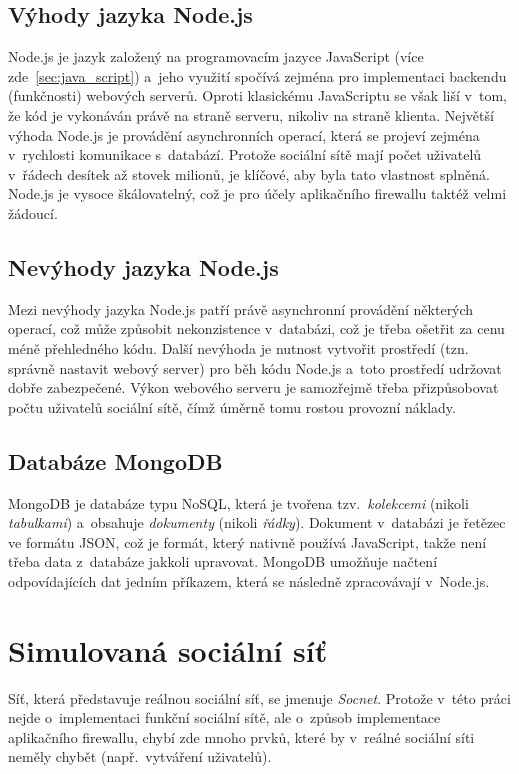 \subsection*{Výhody jazyka Node.js}
Node.js je jazyk založený na programovacím jazyce JavaScript (více zde~\ref{sec:java_script}) a~jeho využití spočívá zejména pro implementaci backendu (funkčnosti) webových serverů. Oproti klasickému JavaScriptu se však liší v~tom, že kód je vykonáván právě na straně serveru, nikoliv na straně klienta. Největší výhoda Node.js je provádění asynchronních operací, která se projeví zejména v~rychlosti komunikace s~databází. Protože sociální sítě mají počet uživatelů v~řádech desítek až stovek milionů, je klíčové, aby byla tato vlastnost splněná. Node.js je vysoce škálovatelný, což je pro účely aplikačního firewallu taktéž velmi žádoucí.

\subsection*{Nevýhody jazyka Node.js}
Mezi nevýhody jazyka Node.js patří právě asynchronní provádění některých operací, což může způsobit nekonzistence v~databázi, což je třeba ošetřit za cenu méně přehledného kódu. Další nevýhoda je nutnost vytvořit prostředí (tzn. správně nastavit webový server) pro běh kódu Node.js a~toto prostředí udržovat dobře zabezpečené. Výkon webového serveru je samozřejmě třeba přizpůsobovat počtu uživatelů sociální sítě, čímž úměrně tomu rostou provozní náklady.

\subsection*{Databáze MongoDB}
MongoDB je databáze typu NoSQL, která je tvořena tzv.~\textit{kolekcemi} (nikoli \textit{tabulkami}) a~obsahuje \textit{dokumenty} (nikoli \textit{řádky}). Dokument v~databázi je řetězec ve formátu JSON, což je formát, který nativně používá JavaScript, takže není třeba data z~databáze jakkoli upravovat. MongoDB umožňuje načtení odpovídajících dat jedním příkazem, která se následně zpracovávají v~Node.js.

\section{Simulovaná sociální síť}
Síť, která představuje reálnou sociální síť, se jmenuje \textit{Socnet}. Protože v~této práci nejde o~implementaci funkční sociální sítě, ale o~způsob implementace aplikačního firewallu, chybí zde mnoho prvků, které by v~reálné sociální síti neměly chybět (např.~vytváření uživatelů).

